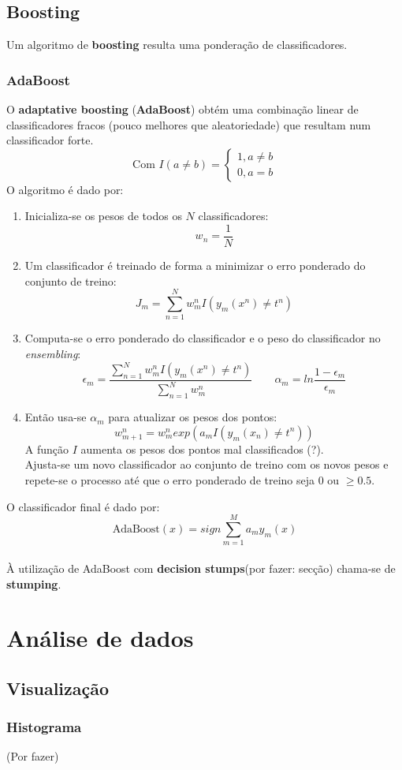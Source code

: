 \documentclass[]{report}
\begin{document}
\section{Boosting}
Um algoritmo de \textbf{boosting} resulta uma ponderação de classificadores.
\subsection{AdaBoost}
O \textbf{adaptative boosting} (\textbf{AdaBoost}) obtém uma combinação linear de classificadores fracos (pouco melhores que aleatoriedade) que resultam num classificador forte.
$$\text{Com }
I(a \neq b) =
\begin{cases}
1 , a\neq b\\
0 , a=b
\end{cases}$$
O algoritmo é dado por:
\begin{enumerate}
\item Inicializa-se os pesos de todos os $N$ classificadores:
$$w_n = \frac{1}{N}$$
\item Um classificador é treinado de forma a minimizar o erro ponderado do conjunto de treino:
$$J_m = \sum_{n=1}^{N}w_m^n I(y_m(x^n)\neq t^n)$$
\item Computa-se o erro ponderado do classificador e o peso do classificador no \textit{ensembling}:
$$\epsilon_m = \frac{\sum\limits_{n=1}^N w_m^n I(y_m(x^n)\neq t^n)}{\sum\limits_{n=1}^N w_m^n} \quad \quad \alpha_m = ln \frac{1 - \epsilon_m}{\epsilon_m}$$
\item Então usa-se $\alpha_m$ para atualizar os pesos dos pontos:
$$w^n_{m+1} = w_m^n exp (a_m I(y_m(x_n) \neq t^n))$$
A função $I$ aumenta os pesos dos pontos mal classificados (?).\\
Ajusta-se um novo classificador ao conjunto de treino com os novos pesos e repete-se o processo até que o erro ponderado de treino seja 0 ou $\geq 0.5$.
\end{enumerate}
O classificador final é dado por:
$$\text{AdaBoost}(x) = sign \sum^M_{m=1} a_m y_m(x)$$\\[2mm]
À utilização de AdaBoost com \textbf{decision stumps}(por fazer: secção) chama-se de \textbf{stumping}.
\chapter{Análise de dados}
\section{Visualização}
\subsection{Histograma}
(Por fazer)
\end{document}
